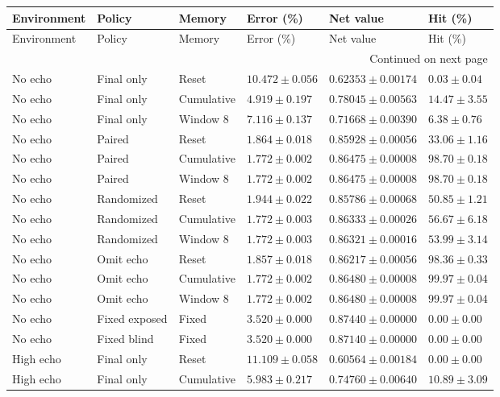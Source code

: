 \begin{longtable}{@{}llllll@{}}
\toprule Environment & Policy & Memory & Error (\%) & Net value & Hit (\%) \\\midrule\endfirsthead
\toprule Environment & Policy & Memory & Error (\%) & Net value & Hit (\%) \\\midrule\endhead
\midrule\multicolumn{6}{r}{Continued on next page}\\\endfoot
\bottomrule\endlastfoot
No echo & Final only & Reset & $10.472 \pm 0.056$ & $0.62353 \pm 0.00174$ & $0.03 \pm 0.04$ \\
No echo & Final only & Cumulative & $4.919 \pm 0.197$ & $0.78045 \pm 0.00563$ & $14.47 \pm 3.55$ \\
No echo & Final only & Window 8 & $7.116 \pm 0.137$ & $0.71668 \pm 0.00390$ & $6.38 \pm 0.76$ \\
No echo & Paired & Reset & $1.864 \pm 0.018$ & $0.85928 \pm 0.00056$ & $33.06 \pm 1.16$ \\
No echo & Paired & Cumulative & $1.772 \pm 0.002$ & $0.86475 \pm 0.00008$ & $98.70 \pm 0.18$ \\
No echo & Paired & Window 8 & $1.772 \pm 0.002$ & $0.86475 \pm 0.00008$ & $98.70 \pm 0.18$ \\
No echo & Randomized & Reset & $1.944 \pm 0.022$ & $0.85786 \pm 0.00068$ & $50.85 \pm 1.21$ \\
No echo & Randomized & Cumulative & $1.772 \pm 0.003$ & $0.86333 \pm 0.00026$ & $56.67 \pm 6.18$ \\
No echo & Randomized & Window 8 & $1.772 \pm 0.003$ & $0.86321 \pm 0.00016$ & $53.99 \pm 3.14$ \\
No echo & Omit echo & Reset & $1.857 \pm 0.018$ & $0.86217 \pm 0.00056$ & $98.36 \pm 0.33$ \\
No echo & Omit echo & Cumulative & $1.772 \pm 0.002$ & $0.86480 \pm 0.00008$ & $99.97 \pm 0.04$ \\
No echo & Omit echo & Window 8 & $1.772 \pm 0.002$ & $0.86480 \pm 0.00008$ & $99.97 \pm 0.04$ \\
No echo & Fixed exposed & Fixed & $3.520 \pm 0.000$ & $0.87440 \pm 0.00000$ & $0.00 \pm 0.00$ \\
No echo & Fixed blind & Fixed & $3.520 \pm 0.000$ & $0.87140 \pm 0.00000$ & $0.00 \pm 0.00$ \\
High echo & Final only & Reset & $11.109 \pm 0.058$ & $0.60564 \pm 0.00184$ & $0.00 \pm 0.00$ \\
High echo & Final only & Cumulative & $5.983 \pm 0.217$ & $0.74760 \pm 0.00640$ & $10.89 \pm 3.09$ \\

\end{longtable}
